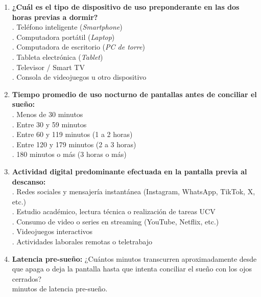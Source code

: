 \documentclass[12pt, letterpaper]{article}
\begin{document}
\begin{enumerate}[leftmargin=*, resume]
    \item \textbf{¿Cuál es el tipo de dispositivo de uso preponderante en las dos horas previas a dormir?} \\
    . Teléfono inteligente (\textit{Smartphone}) \\
    . Computadora portátil (\textit{Laptop}) \\
    . Computadora de escritorio (\textit{PC de torre}) \\
    . Tableta electrónica (\textit{Tablet}) \\
    . Televisor / Smart TV \\
    . Consola de videojuegos u otro dispositivo

    \item \textbf{Tiempo promedio de uso nocturno de pantallas antes de conciliar el sueño:} \\
    . Menos de 30 minutos \\
    . Entre 30 y 59 minutos \\
    . Entre 60 y 119 minutos (1 a 2 horas) \\
    . Entre 120 y 179 minutos (2 a 3 horas) \\
    . 180 minutos o más (3 horas o más)

    \item \textbf{Actividad digital predominante efectuada en la pantalla previa al descanso:} \\
    . Redes sociales y mensajería instantánea (Instagram, WhatsApp, TikTok, X, etc.) \\
    . Estudio académico, lectura técnica o realización de tareas UCV \\
    . Consumo de video o series en streaming (YouTube, Netflix, etc.) \\
    . Videojuegos interactivos \\
    . Actividades laborales remotas o teletrabajo

    \item \textbf{Latencia pre-sueño:} ¿Cuántos minutos transcurren aproximadamente desde que apaga o deja la pantalla hasta que intenta conciliar el sueño con los ojos cerrados? \\
    \quad [\hspace{1.5cm}] minutos de latencia pre-sueño.
\end{enumerate}
\end{document}
